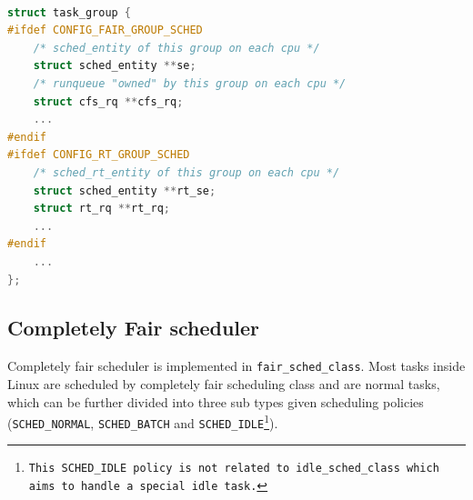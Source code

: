 \begin{lstlisting}[language=C,
caption={\texttt{Specific runqueue information within a task group}},
			label={task_group1}]		

struct task_group {
#ifdef CONFIG_FAIR_GROUP_SCHED
	/* sched_entity of this group on each cpu */
	struct sched_entity **se;
	/* runqueue "owned" by this group on each cpu */
	struct cfs_rq **cfs_rq;
	...
#endif
#ifdef CONFIG_RT_GROUP_SCHED
	/* sched_rt_entity of this group on each cpu */
	struct sched_entity **rt_se;
	struct rt_rq **rt_rq;
	...
#endif
	...
};
\end{lstlisting}

\subsection{Completely Fair scheduler\label{sec:LinuxSched_cfs}}
Completely fair scheduler is implemented in \texttt{fair\_sched\_class}. 
Most tasks inside Linux are scheduled by completely fair scheduling class
and are normal tasks, which can be further divided into three sub 
types given scheduling policies (\texttt{SCHED\_NORMAL}, \texttt{SCHED\_BATCH}
and \texttt{SCHED\_IDLE\footnote{This SCHED\_IDLE policy is not related to
idle\_sched\_class which aims to handle a special idle task.}}).

